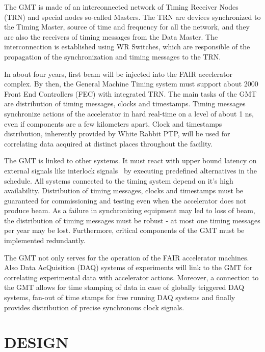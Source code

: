 \documentclass{JAC2003}
\begin{document}
The GMT is made of an interconnected network of Timing Receiver Nodes (TRN) and
special nodes so-called Masters. The TRN are devices synchronized to the Timing
Master, source of time and frequency for all the network, and they are also the
receivers of timing messages from the Data Master. The interconnection is
established using WR Switches, which are responsible of the propagation of the
synchronization and timing messages to the TRN.

In  about  four years,  first  beam will  be  injected  into the  FAIR
accelerator complex. By then,  the General Machine Timing system
must support about 2000  Front End Controllers (FEC) with integrated TRN. 
The main tasks of the GMT are distribution 
of  timing messages, clocks  and timestamps.  Timing messages  synchronize actions of
the accelerator in hard real-time on a level of about 1 ns, even if
components are a few kilometers apart. Clock and timestamps
distribution, inherently  provided by White  Rabbit PTP, will  be used
for  correlating  data  acquired  at distinct  places  throughout  the
facility. 

The GMT  is linked to other  systems.  It must react  with upper bound
latency  on  external  signals  like interlock  signals~\cite{interlock}  by  executing
predefined alternatives in the  schedule. All systems connected to the
timing  system  depend on  it's  high  availability.  Distribution  of
timing messages, clocks and timestamps  must be guaranteed for commissioning and
testing even when the accelerator  does not produce beam. As a failure
in synchronizing equipment  may led to loss of  beam, the distribution
of timing messages must be robust -  at most one timing messages per year
may  be lost.  Furthermore, critical  components  of the  GMT must  be
implemented redundantly.

The  GMT not only  serves for  the operation  of the  FAIR accelerator
machines. Also Data AcQuisition (DAQ) systems of experiments will link
to  the  GMT  for   correlating  experimental  data  with  accelerator
actions. Moreover, a connection to the GMT allows for time stamping of
data in case of globally triggered DAQ systems, fan-out of time stamps
for  free running  DAQ systems  and finally  provides  distribution of
precise synchronous clock signals.


\section{DESIGN}
\end{document}
